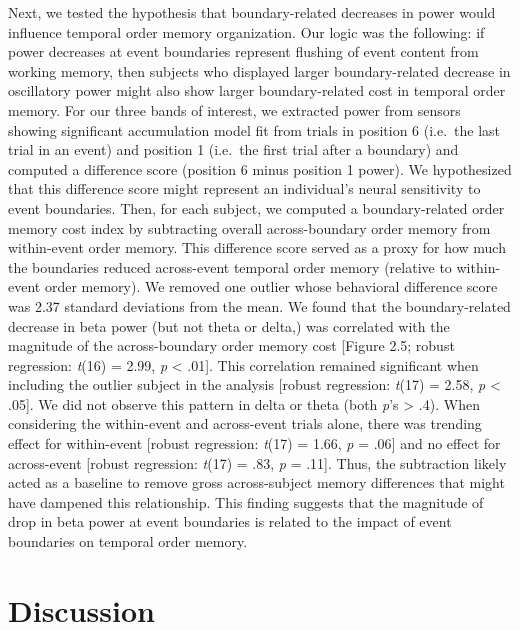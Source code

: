 Next, we tested the hypothesis that boundary-related decreases in power
would influence temporal order memory organization. Our logic was the
following: if power decreases at event boundaries represent flushing of
event content from working memory, then subjects who displayed larger
boundary-related decrease in oscillatory power might also show larger
boundary-related cost in temporal order memory. For our three bands of
interest, we extracted power from sensors showing significant
accumulation model fit from trials in position 6 (i.e.~the last trial in
an event) and position 1 (i.e.~the first trial after a boundary) and
computed a difference score (position 6 minus position 1 power). We
hypothesized that this difference score might represent an individual's
neural sensitivity to event boundaries. Then, for each subject, we
computed a boundary-related order memory cost index by subtracting
overall across-boundary order memory from within-event order memory.
This difference score served as a proxy for how much the boundaries
reduced across-event temporal order memory (relative to within-event
order memory). We removed one outlier whose behavioral difference score
was 2.37 standard deviations from the mean. We found that the
boundary-related decrease in beta power (but not theta or delta,) was
correlated with the magnitude of the across-boundary order memory cost
{[}Figure 2.5; robust regression: \emph{t}(16) = 2.99, \emph{p}
\textless{} .01{]}. This correlation remained significant when including
the outlier subject in the analysis {[}robust regression: \emph{t}(17) =
2.58, \emph{p} \textless{} .05{]}. We did not observe this pattern in
delta or theta (both \emph{p}'s \textgreater{} .4). When considering the
within-event and across-event trials alone, there was trending effect
for within-event {[}robust regression: \emph{t}(17) = 1.66, \emph{p} =
.06{]} and no effect for across-event {[}robust regression: \emph{t}(17)
= .83, \emph{p} = .11{]}. Thus, the subtraction likely acted as a
baseline to remove gross across-subject memory differences that might
have dampened this relationship. This finding suggests that the
magnitude of drop in beta power at event boundaries is related to the
impact of event boundaries on temporal order memory.

\section{Discussion}\label{discussion}

